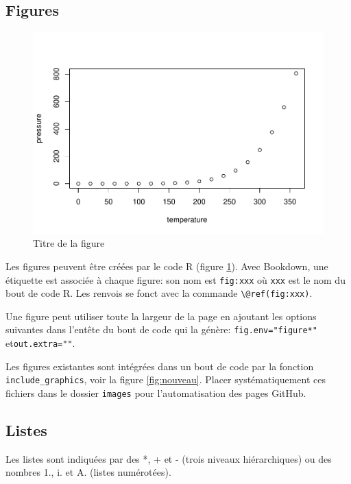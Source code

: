 \documentclass[fleqn,10pt]{ArtEcoFoG} %
\makeatletter
\def\maxwidth{\ifdim\Gin@nat@width>\linewidth\linewidth\else\Gin@nat@width\fi}
\makeatother
\begin{document}
\hypertarget{figures}{%
\subsection{Figures}\label{figures}}

\begin{figure}
\includegraphics[width=\maxwidth]{Mycorrhizas_files/figure-latex/pressure-1} \caption{Titre de la figure}\label{fig:pressure}
\end{figure}

Les figures peuvent être créées par le code R (figure \ref{fig:pressure}).
Avec Bookdown, une étiquette est associée à chaque figure: son nom est \texttt{fig:xxx} où \texttt{xxx} est le nom du bout de code R.
Les renvois se fonct avec la commande \texttt{\textbackslash{}@ref(fig:xxx)}.

Une figure peut utiliser toute la largeur de la page en ajoutant les options suivantes dans l'entête du bout de code qui la génère: \texttt{fig.env="figure*"} et\break \texttt{out.extra=""}.

Les figures existantes sont intégrées dans un bout de code par la fonction \texttt{include\_graphics}, voir la figure \ref{fig:nouveau}.
Placer systématiquement ces fichiers dans le dossier \texttt{images} pour l'automatisation des pages GitHub.

\hypertarget{listes}{%
\subsection{Listes}\label{listes}}

Les listes sont indiquées par des *, + et - (trois niveaux hiérarchiques) ou des nombres 1., i. et A. (listes numérotées).
\end{document}
